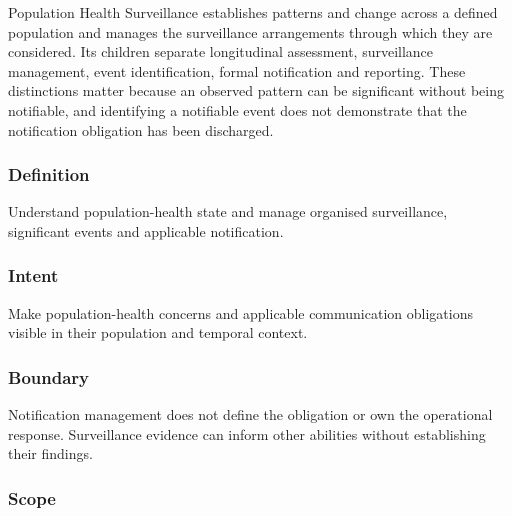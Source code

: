 Population Health Surveillance establishes patterns and change across a defined population and manages the surveillance arrangements through which they are considered. Its children separate longitudinal assessment, surveillance management, event identification, formal notification and reporting. These distinctions matter because an observed pattern can be significant without being notifiable, and identifying a notifiable event does not demonstrate that the notification obligation has been discharged.

\subsubsection*{Definition}

Understand population-health state and manage organised surveillance, significant events and applicable notification.

\subsubsection*{Intent}

Make population-health concerns and applicable communication obligations visible in their population and temporal context.

\subsubsection*{Boundary}

Notification management does not define the obligation or own the operational response. Surveillance evidence can inform other abilities without establishing their findings.

\subsubsection*{Scope}

